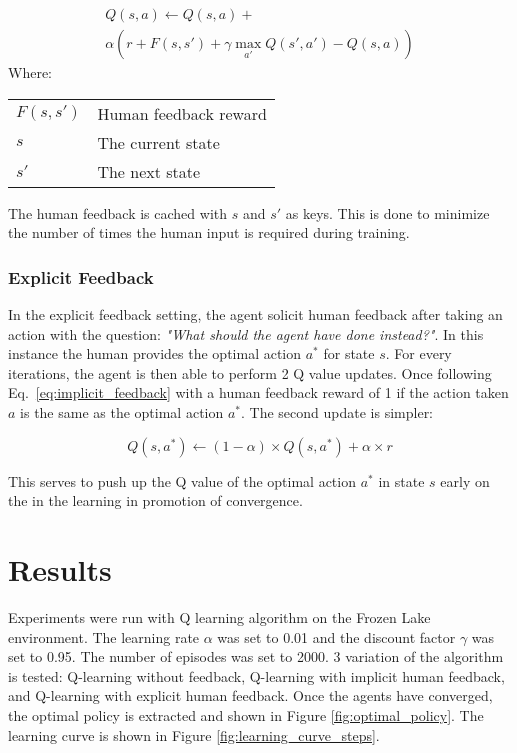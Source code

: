 \documentclass[conference]{IEEEtran}
\makeatletter
\newenvironment{conditions}
  {\par\vspace{\abovedisplayskip}\noindent\begin{tabular}{>{$}l<{$} @{${}={}$} l}}
  {\end{tabular}\par\vspace{\belowdisplayskip}}
\makeatother
\begin{document}
\begin{multline}
    Q(s, a) \leftarrow Q(s, a) + \\
    \alpha \left( r + F(s, s') + \gamma \max_{a'} Q(s', a') - Q(s, a) \right)
    \label{eq:implicit_feedback}
\end{multline}
Where:
\begin{conditions}
    F(s, s') & Human feedback reward \\
    s        & The current state \\
    s'       & The next state \\
\end{conditions}

The human feedback is cached with \(s\) and \(s'\) as keys. This is done to minimize the number of times the human input is required during training.

\subsubsection{Explicit Feedback}

In the explicit feedback setting, the agent solicit human feedback after taking an action with the question: \textit{"What should the agent have done instead?"}. In this instance the human provides the optimal action \(a^*\) for state \(s\). For every iterations, the agent is then able to perform 2 Q value updates. Once following Eq.~\ref{eq:implicit_feedback} with a human feedback reward of 1 if the action taken \(a\) is the same as the optimal action \(a^*\). The second update is simpler:

\begin{equation}
    Q(s, a^*) \leftarrow (1-\alpha) \times Q(s, a^*) + \alpha \times r
    \label{eq:explicit_feedback}
\end{equation}

This serves to push up the Q value of the optimal action \(a^*\) in state \(s\) early on the in the learning in promotion of convergence.

\section{Results}

Experiments were run with Q learning algorithm on the Frozen Lake environment. The learning rate \(\alpha\) was set to 0.01 and the discount factor \(\gamma\) was set to 0.95. The number of episodes was set to 2000. 3 variation of the algorithm is tested: Q-learning without feedback, Q-learning with implicit human feedback, and Q-learning with explicit human feedback. Once the agents have converged, the optimal policy is extracted and shown in Figure \ref{fig:optimal_policy}. The learning curve is shown in Figure \ref{fig:learning_curve_steps}.
\end{document}

